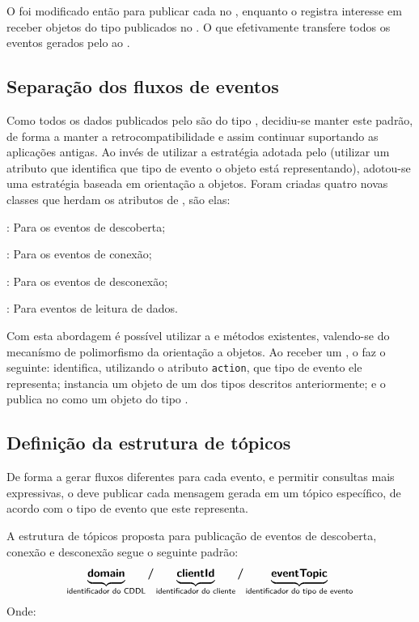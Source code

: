 O \stwopa foi modificado então para publicar cada \sensordata no \eventbus, enquanto o \qocevaluator registra interesse em receber objetos do tipo \sensordata publicados no \eventbus.
O que efetivamente transfere todos os eventos gerados pelo \stwopa ao \cddl.

\subsection{Separação dos fluxos de eventos}

Como todos os dados publicados pelo \cddl são do tipo \msg, decidiu-se manter este padrão, de forma a manter a retrocompatibilidade e assim continuar suportando as aplicações antigas.
Ao invés de utilizar a estratégia adotada pelo \mhub (utilizar um atributo que identifica que tipo de evento o objeto está representando), adotou-se uma estratégia baseada em orientação a objetos.
Foram criadas quatro novas classes que herdam os atributos de \msg, são elas:

\begin{alineas}
	\item \objfoundmsg: Para os eventos de descoberta;
	\item \objconnectedmsg: Para os eventos de conexão;
	\item \objdisconnectedmsg: Para os eventos de desconexão;
	\item \sensordatamsg: Para eventos de leitura de dados.
\end{alineas}

Com esta abordagem é possível utilizar a \api e métodos existentes, valendo-se do mecanísmo de polimorfismo da orientação a objetos.
Ao receber um \sensordata, o \qocevaluator faz o seguinte: identifica, utilizando o atributo \texttt{action}, que tipo de evento ele representa; instancia um objeto de um dos tipos descritos anteriormente; e o publica no \broker \mqtt como um objeto do tipo \msg.


\subsection{Definição da estrutura de tópicos}

De forma a gerar fluxos diferentes para cada evento, e permitir consultas mais expressivas, o \qocevaluator deve publicar cada mensagem gerada em um tópico específico, de acordo com o tipo de evento que este representa.

A estrutura de tópicos proposta para publicação de eventos de descoberta, conexão e desconexão segue o seguinte padrão:
\[
	\underbrace{\bm{\mathsf{domain}}\vphantom{p}}_{\text{\textsf{identificador do CDDL}}}
	\bm{/}
	\underbrace{\bm{\mathsf{clientId}}\vphantom{p}}_{\text{\textsf{identificador do cliente}}}
	\bm{/}
	\underbrace{\bm{\mathsf{eventTopic}}}_{\text{\textsf{identificador do tipo de evento}}}
\]
Onde:

